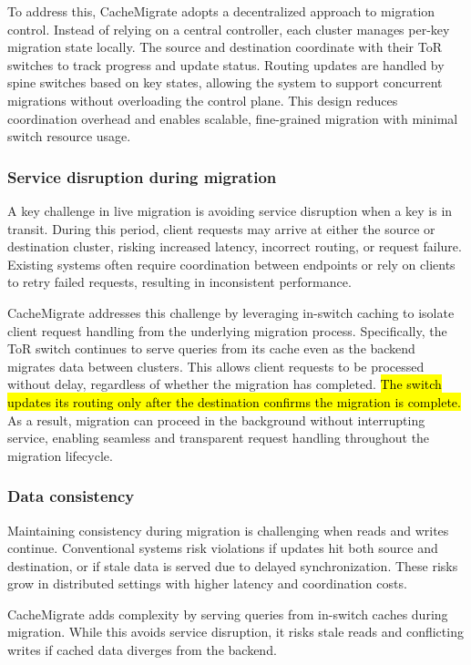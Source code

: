 \documentclass[conference]{IEEEtran}
\DeclareRobustCommand{\hlme}[1]{{\sethlcolor{white}\hl{#1}}}
\begin{document}
To address this, CacheMigrate adopts a decentralized approach to migration control. Instead of relying on a central controller, each cluster manages per-key migration state locally. The source and destination coordinate with their ToR switches to track progress and update status. Routing updates are handled by spine switches based on key states, allowing the system to support concurrent migrations without overloading the control plane. This design reduces coordination overhead and enables scalable, fine-grained migration with minimal switch resource usage.

\subsubsection{Service disruption during migration}
A key challenge in live migration is avoiding service disruption when a key is in transit. During this period, client requests may arrive at either the source or destination cluster, risking increased latency, incorrect routing, or request failure. Existing systems often require coordination between endpoints or rely on clients to retry failed requests, resulting in inconsistent performance.

CacheMigrate addresses this challenge by leveraging in-switch caching to isolate client request handling from the underlying migration process. Specifically, the ToR switch continues to serve queries from its cache even as the backend migrates data between clusters. This allows client requests to be processed without delay, regardless of whether the migration has completed. \hlme{The switch updates its routing only after the destination confirms the migration is complete.} As a result, migration can proceed in the background without interrupting service, enabling seamless and transparent request handling throughout the migration lifecycle.

\subsubsection{Data consistency}
Maintaining consistency during migration is challenging when reads and writes continue.
Conventional systems risk violations if updates hit both source and destination, or if stale data is served due to delayed synchronization.
These risks grow in distributed settings with higher latency and coordination costs.

CacheMigrate adds complexity by serving queries from in-switch caches during migration.
While this avoids service disruption, it risks stale reads and conflicting writes if cached data diverges from the backend.
\end{document}
